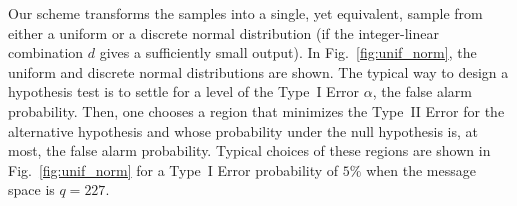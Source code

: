 \documentclass[journal, twoside, web]{ieeecolorpreprint}
\newtheorem{lem}{Lemma}
\begin{document}

Our scheme transforms the samples into a single, yet equivalent, sample from either a uniform or a discrete normal distribution (if the integer-linear combination $d$ gives a sufficiently small output). In Fig.~\ref{fig:unif_norm}, the uniform and discrete normal distributions are shown. The typical way to design a hypothesis test is to settle for a level of the Type~I Error $\alpha$, the false alarm probability. Then, one chooses a region that minimizes the Type~II Error for the alternative hypothesis and whose probability under the null hypothesis is, at most, the false alarm probability. Typical choices of these regions are shown in Fig.~\ref{fig:unif_norm} for a Type~I Error probability of $5 \%$ when the message space is $q=227$.
\end{document}
